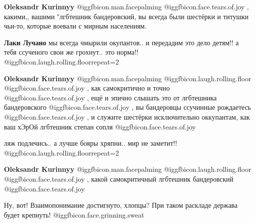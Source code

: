 \begin{itemize}
\begin{itemize}
\textbf{Oleksandr Kurinnyy}  @igg{fbicon.man.facepalming}  @igg{fbicon.face.tears.of.joy} , какими,, вашими "лгбтешник бандеровский, вы всегда были шестёрки и титушки чьи-то, которые воевали с мирным населениям.

\textbf{Лаки Лучано} мы всегда чмырили окупантов.. и передадим это дело детям!! а тебя ссученого свои же грохнут.. это норма!! @igg{fbicon.laugh.rolling.floor}{repeat=2} 

\textbf{Oleksandr Kurinnyy}  @igg{fbicon.man.facepalming}  @igg{fbicon.laugh.rolling.floor}  @igg{fbicon.face.tears.of.joy} , как самокритично и точно  @igg{fbicon.face.tears.of.joy} , ещё и эпично слышать это от лгбтешника бандеровского  @igg{fbicon.face.tears.of.joy} , вы бандеровцы ссучинные рождаетесь  @igg{fbicon.face.tears.of.joy} , и служите шестёрки исключительно оккупантам, как ваш хЭрОй лгбтешник степан сопля  @igg{fbicon.face.tears.of.joy} 

ляж подлечись.. а лучше бояры хряпни.. мир не заметит!! @igg{fbicon.laugh.rolling.floor}{repeat=2} 

\textbf{Oleksandr Kurinnyy}  @igg{fbicon.man.facepalming}  @igg{fbicon.laugh.rolling.floor}  @igg{fbicon.face.tears.of.joy} , какой самокритичный лгбтешник бандеровский  @igg{fbicon.face.tears.of.joy} 

Ну, вот! Взаимопонимание достигнуто, хлопцы? При таком раскладе держава будет крепнуть! @igg{fbicon.face.grinning.sweat} 
\end{itemize} %


\end{itemize} %
